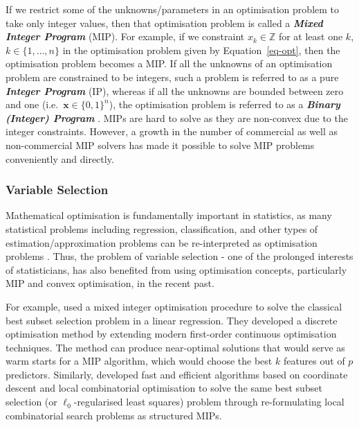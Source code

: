 \documentclass[11pt,a4paper,]{article}
\begin{document}
If we restrict some of the unknowns/parameters in an optimisation
problem to take only integer values, then that optimisation problem is
called a \textbf{\emph{Mixed Integer Program}} (MIP). For example, if we
constraint \(x_{k} \in \mathbb{Z}\) for at least one \(k\),
\(k \in \{1, \dots, n\}\) in the optimisation problem given by
Equation~\ref{eq-opt}, then the optimisation problem becomes a MIP. If
all the unknowns of an optimisation problem are constrained to be
integers, such a problem is referred to as a pure \textbf{\emph{Integer
Program}} (IP), whereas if all the unknowns are bounded between zero and
one (i.e.~\(\bm{x} \in \{ 0, 1 \}^{n}\)), the optimisation problem is
referred to as a \textbf{\emph{Binary (Integer) Program}}
\autocite{Theusl2020}. MIPs are hard to solve as they are non-convex due
to the integer constraints. However, a growth in the number of
commercial as well as non-commercial MIP solvers has made it possible to
solve MIP problems conveniently and directly.

\hypertarget{variable-selection}{%
\subsubsection{Variable Selection}\label{variable-selection}}

Mathematical optimisation is fundamentally important in statistics, as
many statistical problems including regression, classification, and
other types of estimation/approximation problems can be re-interpreted
as optimisation problems \autocite{Theusl2020}. Thus, the problem of
variable selection - one of the prolonged interests of statisticians,
has also benefited from using optimisation concepts, particularly MIP
and convex optimisation, in the recent past.

For example, \textcite{Bertsimas2016} used a mixed integer optimisation
procedure to solve the classical best subset selection problem in a
linear regression. They developed a discrete optimisation method by
extending modern first-order continuous optimisation techniques. The
method can produce near-optimal solutions that would serve as warm
starts for a MIP algorithm, which would choose the best \(k\) features
out of \(p\) predictors. Similarly, \textcite{Hazimeh2020} developed
fast and efficient algorithms based on coordinate descent and local
combinatorial optimisation to solve the same best subset selection (or
\(\ell_{0}\)-regularised least squares) problem through re-formulating
local combinatorial search problems as structured MIPs.
\end{document}
